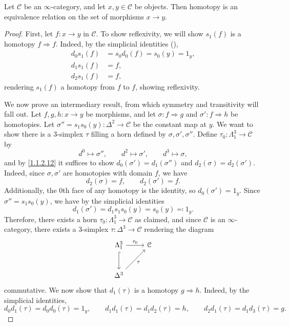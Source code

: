 \begin{proposition}\label{1.2.3.6}
	Let $\mathcal{C} $ be an $\infty $-category, and let $x,y\in \mathcal{C} $ be objects. Then homotopy is an equivalence relation on the set of morphisms $x\to y$.
\end{proposition}
\begin{proof}
	First, let $f : x \to y$ in $\mathcal{C} $. To show reflexivity, we will show $s_1(f)$ is a homotopy $f \Rightarrow f$. Indeed, by the simplicial identities (\cite{ssets}),
	\begin{align*}
		d_0s_1(f)&=s_0d_0(f)=s_0(y)=1_y,\\
		d_1s_1(f)&=f,\\
		d_2s_1(f)&=f
	,\end{align*}
	rendering $s_1(f)$ a homotopy from $f$ to $f$, showing reflexivity.

	We now prove an intermediary result, from which symmetry and transitivity will fall out. Let $f,g,h : x \to y$ be morphisms, and let $\sigma : f \Rightarrow g$ and $\sigma ' : f \Rightarrow h$ be homotopies. Let $\sigma ''=s_1s_0(y) : \Delta ^2 \to \mathcal{C} $ be the constant map at $y$. We want to show there is a 3-simplex $\tau $ filling a horn defined by $\sigma ,\sigma ',\sigma ''$. Define $\tau _0 : \Lambda _1^3 \to \mathcal{C} $ by
	\[
		d^0\mapsto \sigma '',\qquad d^2\mapsto \sigma ',\qquad d^3\mapsto \sigma ,
	\]
	and by \cref{1.1.2.12} it suffices to show $d_0(\sigma ')=d_1(\sigma '')$ and $d_2(\sigma )=d_2(\sigma ')$. Indeed, since $\sigma ,\sigma '$ are homotopies with domain $f$, we have
	\[
		d_2(\sigma )=f,\qquad d_2(\sigma ')=f.
	\]
	Additionally, the 0th face of any homotopy is the identity, so $d_0(\sigma ')=1_y$. Since $\sigma ''=s_1s_0(y)$, we have by the simplicial identities
	\[
		d_1(\sigma ')=d_1s_1s_0(y)=s_0(y)\eqqcolon 1_y
	.\]
	Therefore, there exists a horn $\tau _0 : \Lambda _1^3 \to \mathcal{C} $ as claimed, and since $\mathcal{C} $ is an $\infty $-category, there exists a 3-simplex $\tau : \Delta ^3 \to \mathcal{C} $ rendering the diagram
	\[\begin{tikzcd}[row sep = 2.5em, column sep = 2.5em]
	\Lambda _1^3\ar[" \tau _0 ", r] \ar[hook, d]  & \mathcal{C}  \\
	\Delta ^3 \ar[" \tau  "', ur]  & 
	\end{tikzcd}\]
	commutative. We now show that $d_1(\tau )$ is a homotopy $g\Rightarrow h$. Indeed, by the simplicial identities,
	\[
		d_0d_1(\tau )=d_0d_0(\tau )=1_y,\qquad d_1d_1(\tau )=d_1d_2(\tau )=h,\qquad d_2d_1(\tau )=d_1d_3(\tau )=g
	.\]
	

\end{proof}
